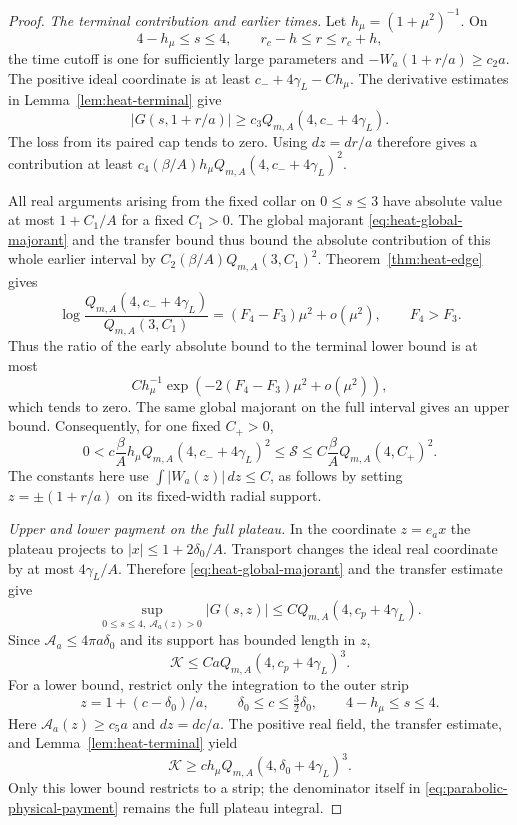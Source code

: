 \begin{proof}
\emph{The terminal contribution and earlier times.}
Let $h_\mu=(1+\mu^2)^{-1}$.  On
\[
 4-h_\mu\le s\le4,\qquad r_c-h\le r\le r_c+h,
\]
the time cutoff is one for sufficiently large parameters and
$-W_a(1+r/a)\ge c_2 a$.  The positive ideal coordinate is at least
$c_-+4\gamma_L-C h_\mu$.  The derivative estimates in
Lemma~\ref{lem:heat-terminal} give
\[
 |G(s,1+r/a)|\ge c_3 Q_{m,A}(4,c_-+4\gamma_L).
\]
The loss from its paired cap tends to zero.  Using $dz=dr/a$ therefore
gives a contribution at least
$c_4(\beta/A)h_\mu Q_{m,A}(4,c_-+4\gamma_L)^2$.

All real arguments arising from the fixed collar on $0\le s\le3$
have absolute value at most $1+C_1/A$ for a fixed $C_1>0$.
The global majorant \eqref{eq:heat-global-majorant} and the transfer
bound thus bound the absolute contribution of this whole earlier
interval by
$C_2(\beta/A)Q_{m,A}(3,C_1)^2$.
Theorem~\ref{thm:heat-edge} gives
\[
 \log\frac{Q_{m,A}(4,c_-+4\gamma_L)}{Q_{m,A}(3,C_1)}
   =(F_4-F_3)\mu^2+o(\mu^2),\qquad F_4>F_3.
\]
Thus the ratio of the early absolute bound to the terminal lower bound
is at most
\[
 C h_\mu^{-1}\exp(-2(F_4-F_3)\mu^2+o(\mu^2)),
\]
which tends to zero.
The same global majorant on the full interval gives an upper bound.
Consequently, for one fixed $C_+>0$,
\begin{equation}\label{eq:parabolic-S-bounds}
 0<c\frac\beta A h_\mu Q_{m,A}(4,c_-+4\gamma_L)^2
 \le\mathcal S
 \le C\frac\beta A Q_{m,A}(4,C_+)^2.
\end{equation}
The constants here use
$\int|W_a(z)|\,dz\le C$, as follows by setting
$z=\pm(1+r/a)$ on its fixed-width radial support.

\emph{Upper and lower payment on the full plateau.}
In the coordinate $z=e_ax$ the plateau projects to
$|x|\le1+2\delta_0/A$.  Transport changes the ideal real coordinate
by at most $4\gamma_L/A$.  Therefore
\eqref{eq:heat-global-majorant} and the transfer estimate give
\[
 \sup_{0\le s\le4,\ \mathcal A_a(z)>0}|G(s,z)|
 \le C Q_{m,A}(4,c_p+4\gamma_L).
\]
Since $\mathcal A_a\le4\pi a\delta_0$ and its support has bounded
length in $z$,
\begin{equation}\label{eq:parabolic-K-upper}
 \mathcal K\le Ca Q_{m,A}(4,c_p+4\gamma_L)^3.
\end{equation}
For a lower bound, restrict only the integration to the outer strip
\[
 z=1+(c-\delta_0)/a,
 \qquad \delta_0\le c\le\tfrac32\delta_0,
 \qquad 4-h_\mu\le s\le4.
\]
Here $\mathcal A_a(z)\ge c_5a$ and $dz=dc/a$.
The positive real field, the transfer estimate, and
Lemma~\ref{lem:heat-terminal} yield
\begin{equation}\label{eq:parabolic-K-lower}
 \mathcal K\ge c h_\mu
       Q_{m,A}(4,\delta_0+4\gamma_L)^3.
\end{equation}
Only this lower bound restricts to a strip; the denominator itself in
\eqref{eq:parabolic-physical-payment} remains the full plateau integral.


\end{proof}
